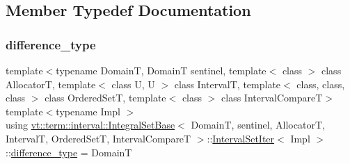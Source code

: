 \subsection{Member Typedef Documentation}
\mbox{\label{structvt_1_1term_1_1interval_1_1_integral_set_base_1_1_interval_set_iter_aba8b3805fbc28a4fbb78cad61e0f2ed4}} 
\subsubsection{\texorpdfstring{difference\+\_\+type}{difference\_type}}
{\footnotesize\ttfamily template$<$typename DomainT, DomainT sentinel, template$<$ class $>$ class AllocatorT, template$<$ class U, U $>$ class IntervalT, template$<$ class, class, class $>$ class Ordered\+SetT, template$<$ class $>$ class Interval\+CompareT$>$ \\
template$<$typename Impl $>$ \\
using \hyperlink{structvt_1_1term_1_1interval_1_1_integral_set_base}{vt\+::term\+::interval\+::\+Integral\+Set\+Base}$<$ DomainT, sentinel, AllocatorT, IntervalT, Ordered\+SetT, Interval\+CompareT $>$\+::\hyperlink{structvt_1_1term_1_1interval_1_1_integral_set_base_1_1_interval_set_iter}{Interval\+Set\+Iter}$<$ Impl $>$\+::\hyperlink{structvt_1_1term_1_1interval_1_1_integral_set_base_1_1_interval_set_iter_aba8b3805fbc28a4fbb78cad61e0f2ed4}{difference\+\_\+type} =  DomainT}

\mbox{\label{structvt_1_1term_1_1interval_1_1_integral_set_base_1_1_interval_set_iter_a4056b2dcca9f60143d2d76387599e6e1}} 
